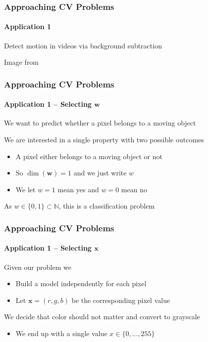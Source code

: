 \documentclass[xetex,professionalfont]{beamer}
\newcommand{\NN}{\mathbb{N}}
\renewcommand{\vec}[1]{\ensuremath{\mathbf{#1}}}
\newcommand{\vw}{\vec{w}}
\newcommand{\vx}{\vec{x}}
\renewcommand\emph[1]{\textcolor{tuwcvl_inf_red}{#1}}
\begin{document}
\begin{frame}
\frametitle{Approaching CV Problems}
\framesubtitle{Application 1}

Detect motion in videos via background subtraction

\bigskip
\begin{center}
    {\centering Image from \cite{prince12}}
\end{center}

\end{frame}


\begin{frame}
\frametitle{Approaching CV Problems}
\framesubtitle{Application 1 -- Selecting $\vw$}

We want to predict whether a pixel belongs to a moving object

\bigskip
We are interested in a single property with two possible outcomes
\begin{itemize}
    \item A pixel either belongs to a moving object or not
    \item So $\dim(\vw)=1$ and we just write $w$
    \item We let $w=1$ mean yes and $w=0$ mean no
\end{itemize}

\bigskip
As $w\in\{0,1\}\subset\NN$, this is a \emph{classification problem}

\end{frame}


\begin{frame}
\frametitle{Approaching CV Problems}
\framesubtitle{Application 1 -- Selecting $\vx$}

Given our problem we
\begin{itemize}
    \item Build a model independently for each pixel %
    \item Let $\vx=(r,g,b)$ be the corresponding pixel value
\end{itemize}

\bigskip
We decide that color should not matter and convert to grayscale
\begin{itemize}
    \item We end up with a single value $x\in\{0,\dots,255\}$ %
\end{itemize}

\end{frame}
\end{document}
